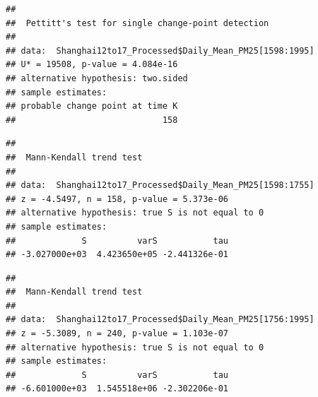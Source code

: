 \documentclass[12pt,]{article}
\newenvironment{Shaded}{\begin{snugshade}}{\end{snugshade}}
\newcommand{\KeywordTok}[1]{\textcolor[rgb]{0.13,0.29,0.53}{\textbf{#1}}}
\newcommand{\DecValTok}[1]{\textcolor[rgb]{0.00,0.00,0.81}{#1}}
\newcommand{\CommentTok}[1]{\textcolor[rgb]{0.56,0.35,0.01}{\textit{#1}}}
\newcommand{\OperatorTok}[1]{\textcolor[rgb]{0.81,0.36,0.00}{\textbf{#1}}}
\newcommand{\NormalTok}[1]{#1}
\begin{document}
\begin{Shaded}
\end{Shaded}

\begin{verbatim}
## 
##  Pettitt's test for single change-point detection
## 
## data:  Shanghai12to17_Processed$Daily_Mean_PM25[1598:1995]
## U* = 19508, p-value = 4.084e-16
## alternative hypothesis: two.sided
## sample estimates:
## probable change point at time K 
##                             158
\end{verbatim}

\begin{Shaded}
\end{Shaded}

\begin{verbatim}
## 
##  Mann-Kendall trend test
## 
## data:  Shanghai12to17_Processed$Daily_Mean_PM25[1598:1755]
## z = -4.5497, n = 158, p-value = 5.373e-06
## alternative hypothesis: true S is not equal to 0
## sample estimates:
##             S          varS           tau 
## -3.027000e+03  4.423650e+05 -2.441326e-01
\end{verbatim}

\begin{Shaded}
\end{Shaded}

\begin{verbatim}
## 
##  Mann-Kendall trend test
## 
## data:  Shanghai12to17_Processed$Daily_Mean_PM25[1756:1995]
## z = -5.3089, n = 240, p-value = 1.103e-07
## alternative hypothesis: true S is not equal to 0
## sample estimates:
##             S          varS           tau 
## -6.601000e+03  1.545518e+06 -2.302206e-01
\end{verbatim}
\end{document}
